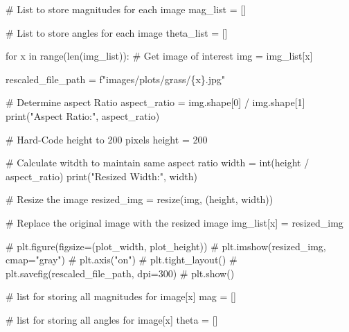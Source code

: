 \documentclass[
  letterpaper,
  DIV=11,
  numbers=noendperiod]{scrreprt}
\newenvironment{Shaded}{\begin{snugshade}}{\end{snugshade}}
\newcommand{\BuiltInTok}[1]{\textcolor[rgb]{0.00,0.23,0.31}{#1}}
\newcommand{\CommentTok}[1]{\textcolor[rgb]{0.37,0.37,0.37}{#1}}
\newcommand{\ControlFlowTok}[1]{\textcolor[rgb]{0.00,0.23,0.31}{#1}}
\newcommand{\DecValTok}[1]{\textcolor[rgb]{0.68,0.00,0.00}{#1}}
\newcommand{\KeywordTok}[1]{\textcolor[rgb]{0.00,0.23,0.31}{#1}}
\newcommand{\NormalTok}[1]{\textcolor[rgb]{0.00,0.23,0.31}{#1}}
\newcommand{\OperatorTok}[1]{\textcolor[rgb]{0.37,0.37,0.37}{#1}}
\newcommand{\SpecialCharTok}[1]{\textcolor[rgb]{0.37,0.37,0.37}{#1}}
\newcommand{\SpecialStringTok}[1]{\textcolor[rgb]{0.13,0.47,0.30}{#1}}
\newcommand{\StringTok}[1]{\textcolor[rgb]{0.13,0.47,0.30}{#1}}
\begin{document}
\begin{Shaded}
\begin{Highlighting}[]
\CommentTok{\# List to store magnitudes for each image}
\NormalTok{mag\_list }\OperatorTok{=}\NormalTok{ []}

\CommentTok{\# List to store angles for each image}
\NormalTok{theta\_list }\OperatorTok{=}\NormalTok{ []}


\ControlFlowTok{for}\NormalTok{ x }\KeywordTok{in} \BuiltInTok{range}\NormalTok{(}\BuiltInTok{len}\NormalTok{(img\_list)):}
    \CommentTok{\# Get image of interest}
\NormalTok{    img }\OperatorTok{=}\NormalTok{ img\_list[x]}
    
\NormalTok{    rescaled\_file\_path }\OperatorTok{=} \SpecialStringTok{f"images/plots/grass/}\SpecialCharTok{\{}\NormalTok{x}\SpecialCharTok{\}}\SpecialStringTok{.jpg"}
    
    \CommentTok{\# Determine aspect Ratio}
\NormalTok{    aspect\_ratio }\OperatorTok{=}\NormalTok{ img.shape[}\DecValTok{0}\NormalTok{] }\OperatorTok{/}\NormalTok{ img.shape[}\DecValTok{1}\NormalTok{]}
    \BuiltInTok{print}\NormalTok{(}\StringTok{"Aspect Ratio:"}\NormalTok{, aspect\_ratio)}
    
    \CommentTok{\# Hard{-}Code height to 200 pixels}
\NormalTok{    height }\OperatorTok{=} \DecValTok{200}
    
    \CommentTok{\# Calculate witdth to maintain same aspect ratio}
\NormalTok{    width }\OperatorTok{=} \BuiltInTok{int}\NormalTok{(height }\OperatorTok{/}\NormalTok{ aspect\_ratio)}
    \BuiltInTok{print}\NormalTok{(}\StringTok{"Resized Width:"}\NormalTok{, width)}
    
    \CommentTok{\# Resize the image}
\NormalTok{    resized\_img }\OperatorTok{=}\NormalTok{ resize(img, (height, width))}
    
    \CommentTok{\# Replace the original image with the resized image}
\NormalTok{    img\_list[x] }\OperatorTok{=}\NormalTok{ resized\_img}
    
    \CommentTok{\# plt.figure(figsize=(plot\_width, plot\_height))}
    \CommentTok{\# plt.imshow(resized\_img, cmap="gray")}
    \CommentTok{\# plt.axis("on")}
    \CommentTok{\# plt.tight\_layout()}
    \CommentTok{\# plt.savefig(rescaled\_file\_path, dpi=300)}
    \CommentTok{\# plt.show()}

    
    \CommentTok{\# list for storing all magnitudes for image[x]}
\NormalTok{    mag }\OperatorTok{=}\NormalTok{ []}
    
    \CommentTok{\# list for storing all angles for image[x]}
\NormalTok{    theta }\OperatorTok{=}\NormalTok{ []}
    

\end{Highlighting}
\end{Shaded}
\end{document}

